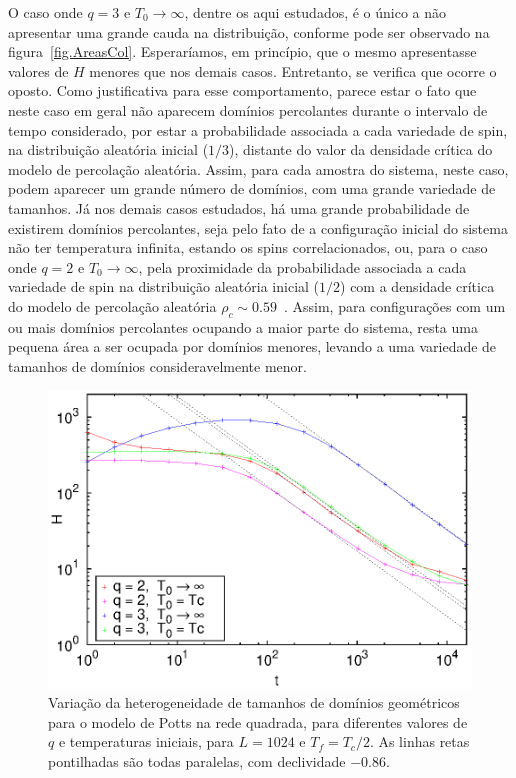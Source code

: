 O caso onde $q=3$ e $T_0\rightarrow \infty$, dentre os aqui estudados, é o único a não apresentar uma grande cauda na distribuição, conforme pode ser observado na figura~\ref{fig.AreasCol}. Esperaríamos, em princípio, que o mesmo apresentasse valores de $H$ menores que nos demais casos. Entretanto, se verifica que ocorre o oposto. Como justificativa para esse comportamento, parece estar o fato que neste caso em geral não aparecem domínios percolantes durante o intervalo de tempo considerado, por estar a probabilidade associada a cada variedade de spin, na distribuição aleatória inicial ($1/3$), distante do valor da densidade crítica do modelo de percolação aleatória. Assim, para cada amostra do sistema, neste caso, podem aparecer um grande número de domínios, com uma grande variedade de tamanhos. Já nos demais casos estudados, há uma grande probabilidade de existirem domínios percolantes, seja pelo fato de a configuração inicial do sistema não ter temperatura infinita, estando os spins correlacionados, ou, para o caso onde $q=2$ e $T_0\rightarrow \infty$, pela proximidade da probabilidade associada a cada variedade de spin na distribuição aleatória inicial ($1/2$) com a densidade crítica do modelo de percolação aleatória $\rho_c \sim 0.59$~\cite{PRLJeferson}. Assim, para configurações com um ou mais domínios percolantes ocupando a maior parte do sistema, resta uma pequena área a ser ocupada por domínios menores, levando a uma variedade de tamanhos de domínios consideravelmente menor.

\begin{figure}[h!]
 \centering
 \includegraphics[width=14cm]{fig/het_L1024_Tc2_lines.eps}
 \caption{Variação da heterogeneidade de tamanhos de domínios geométricos para o modelo de Potts na rede quadrada, para diferentes valores de $q$ e temperaturas iniciais, para $L=1024$ e $T_f=T_c/2$. As linhas retas pontilhadas são todas paralelas, com declividade $-0.86$.}
\label{fig.het_L1024_Tc2_lines}
\end{figure}

